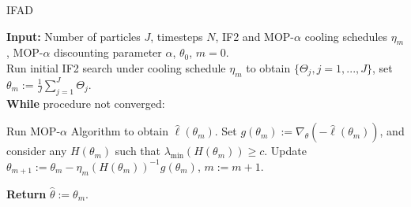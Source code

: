\documentclass[11pt]{report}
\begin{document}
\begin{algorithm}[ht]
\caption{IFAD}
\textbf{Input:} Number of particles $J$, timesteps $N$, IF2 and MOP-$\alpha$ cooling schedules $\eta_m$, MOP-$\alpha$ discounting parameter $\alpha$, $\theta_0$, $m=0$.
\\
Run initial IF2 search under cooling schedule $\eta_m$ to obtain $\{\Theta_j, j=1,...,J\}$, set $\theta_m := \frac{1}{J}\sum_{j=1}^J \Theta_j$.\\
\textbf{While} procedure not converged:
\begin{algorithmic}[1]
\State Run MOP-$\alpha$ Algorithm to obtain $\hat{\ell}(\theta_m)$.
\State Set $g(\theta_m) := \nabla_{\theta}(-\hat{\ell}(\theta_m))$, and consider any $H(\theta_m)$ such that $\lambda_{\min}(H(\theta_m)) \geq c$.
\State Update $\theta_{m+1} := \theta_m - \eta_m (H(\theta_m))^{-1} g(\theta_m)$, $m := m+1$.
\end{algorithmic}
\textbf{Return} $\hat{\theta} := \theta_m$.
\end{algorithm}

\bigskip


\newpage
{}
\printindex
\end{document}
